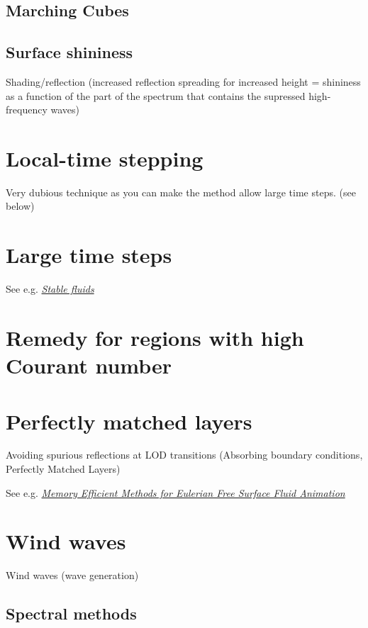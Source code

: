 \subsection{Marching Cubes}

\subsection{Surface shininess}

Shading/reflection (increased reflection spreading for increased height = shininess as a function of the part of the spectrum that contains the supressed high-frequency waves)

\section{Local-time stepping}

Very dubious technique as you can make the method allow large time steps. (see below)

\section{Large time steps}

See e.g. \textit{\href{http://www.dgp.toronto.edu/people/stam/reality/Research/pdf/ns.pdf}{Stable fluids}}

\section{Remedy for regions with high Courant number}

\section{Perfectly matched layers}

Avoiding spurious reflections at LOD transitions (Absorbing boundary conditions, Perfectly Matched Layers)

See e.g. \textit{\href{http://liu.diva-portal.org/smash/get/diva2:359805/FULLTEXT01}{Memory Efficient Methods for Eulerian Free Surface Fluid Animation}}

\section{Wind waves}

Wind waves (wave generation)

\subsection{Spectral methods}

